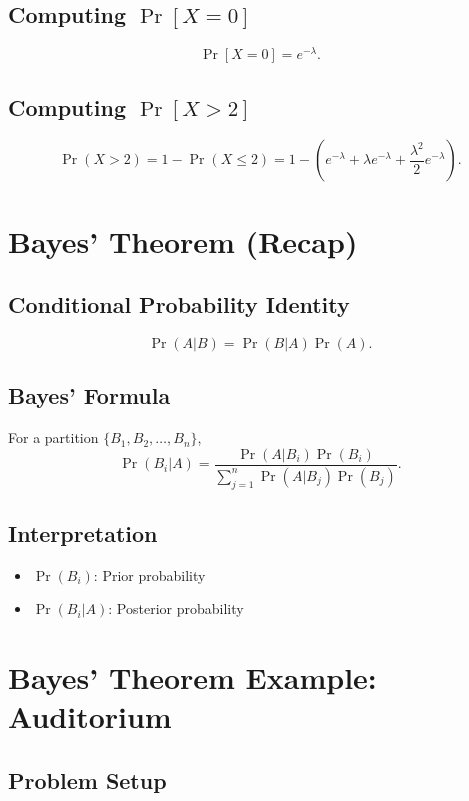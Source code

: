 \documentclass[11pt]{article}
\begin{document}
\subsection{Computing $\Pr[X=0]$}

\[
\Pr[X=0]=e^{-\lambda}.
\]

\subsection{Computing $\Pr[X>2]$}

\[
\Pr(X>2)=1-\Pr(X\le2)
=1-\left(e^{-\lambda}+\lambda e^{-\lambda}+\frac{\lambda^2}{2}e^{-\lambda}\right).
\]

\section{Bayes' Theorem (Recap)}

\subsection{Conditional Probability Identity}

\[
\Pr(A|B)=\Pr(B|A)\Pr(A).
\]

\subsection{Bayes' Formula}

For a partition $\{B_1,B_2,\ldots,B_n\}$,
\[
\Pr(B_i|A)=
\frac{\Pr(A|B_i)\Pr(B_i)}
{\sum_{j=1}^{n}\Pr(A|B_j)\Pr(B_j)}.
\]

\subsection{Interpretation}

\begin{itemize}
    \item $\Pr(B_i)$: Prior probability
    \item $\Pr(B_i|A)$: Posterior probability
\end{itemize}

\section{Bayes' Theorem Example: Auditorium}

\subsection{Problem Setup}
\end{document}
